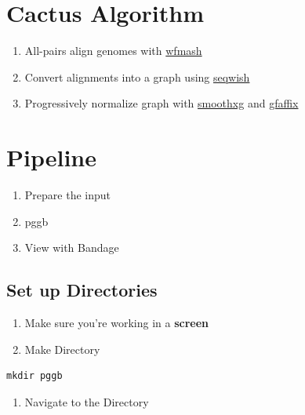 \documentclass[
]{book}
\providecommand{\tightlist}{%
  \setlength{\itemsep}{0pt}\setlength{\parskip}{0pt}}
\begin{document}
\hypertarget{cactus-algorithm-1}{%
\section{Cactus Algorithm}\label{cactus-algorithm-1}}

\begin{enumerate}
\def\labelenumi{\arabic{enumi}.}
\tightlist
\item
  All-pairs align genomes with \href{https://github.com/waveygang/wfmash}{wfmash}
\item
  Convert alignments into a graph using \href{https://github.com/ekg/seqwish}{seqwish}
\item
  Progressively normalize graph with \href{https://github.com/pangenome/smoothxg}{smoothxg} and \href{https://github.com/marschall-lab/GFAffix}{gfaffix}
\end{enumerate}

\hypertarget{pipeline-3}{%
\section{Pipeline}\label{pipeline-3}}

\begin{enumerate}
\def\labelenumi{\arabic{enumi}.}
\tightlist
\item
  Prepare the input
\item
  pggb
\item
  View with Bandage
\end{enumerate}

\hypertarget{set-up-directories-3}{%
\subsection{Set up Directories}\label{set-up-directories-3}}

\begin{enumerate}
\def\labelenumi{\arabic{enumi}.}
\item
  Make sure you're working in a \textbf{screen}
\item
  Make Directory
\end{enumerate}

\begin{verbatim}
mkdir pggb
\end{verbatim}

\begin{enumerate}
\def\labelenumi{\arabic{enumi}.}
\setcounter{enumi}{2}
\tightlist
\item
  Navigate to the Directory
\end{enumerate}
\end{document}
